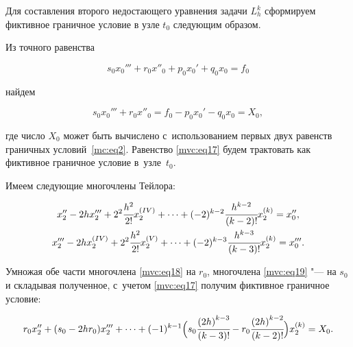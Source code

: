 Для составления второго недостающего уравнения задачи $L_h^k$ сформируем фиктивное граничное условие в узле $  t_0$ следующим образом.

Из точного равенства

\begin{equation}

\label{mvc:eq16}

  s_0x_0'''+r_0x''_0+p_0x_0'+q_0x_0=f_0

\end{equation}

найдем

\begin{equation}

\label{mvc:eq17}

  s_0x_0'''+r_0x''_0=f_0-p_0x_0'-q_0x_0=X_0,

\end{equation}

где число $   X_0$ может быть вычислено с~использованием первых двух равенств граничных условий~\eqref{mc:eq2}. Равенство \eqref{mvc:eq17} будем трактовать как фиктивное граничное условие в~узле~$  t_0$.



Имеем следующие многочлены Тейлора:

\begin{gather}

\label{mvc:eq18}

  x_2''-2 h x'''_2+2^2 \cfrac{h^{2}}{2!} x_{2}^{(IV)}+\dots+(-2)^{k-2}\cfrac{h^{k-2}}{{(k-2)}!} x_2^{(k)}=x_0'',

\\

\label{mvc:eq19}

  x_2'''-2 h x_2^{(IV)}+2^2 \cfrac{h^{2}}{2!} x_{2}^{(V)}+\dots+(-2)^{k-3}\cfrac{h^{k-3}}{{(k-3)}!} x_2^{(k)}=x_0'''.

\end{gather}

Умножая обе части многочлена \eqref{mvc:eq18} на $   r_0$, многочлена \eqref{mvc:eq19} "--- на $   s_0$ и складывая полученное, с~учетом  \eqref{mvc:eq17}  получим фиктивное граничное условие:

\begin{equation}

\label{mvc:eq20}

  r_0x_2''+(s_0-2 hr_0)x'''_2+\dots+

(-1)^{k-1} \Bigl(s_0 \cfrac{{(2h)}^{k-3}}{(k-3)!}-r_0 \cfrac{{(2h)}^{k-2}}{(k-2)!}\Bigr)x_{2}^{(k)}=X_0.

\end{equation}



